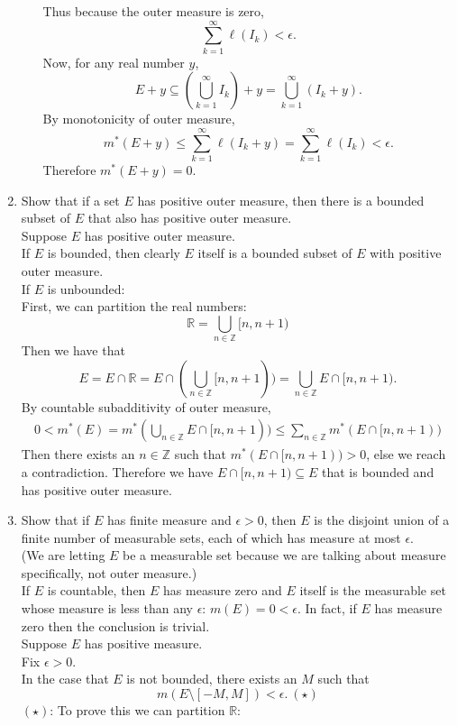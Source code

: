 \begin{enumerate}
\begin{enumerate}[label=(\roman*),align=left]
		Thus because the outer measure is zero, 
		\[
			\sum_{k=1}^\infty \ell(I_k) <\epsilon.
		\]
		Now, for any real number $y$,
		\[
			E+y \subseteq (\bigcup_{k=1}^\infty I_k)+y=\bigcup_{k=1}^\infty (I_k+y).
		\]
		By monotonicity of outer measure, 
		\[
			m^*(E+y)\le \sum_{k=1}^\infty\ell(I_k+y)=\sum_{k=1}^\infty\ell(I_k)<\epsilon.
		\]
		Therefore $m^*(E+y)=0$.
    \end{enumerate}
    \item Show that if a set $E$ has positive outer measure, then there is a bounded subset of $E$ that also has positive outer measure.\\
    Suppose $E$ has positive outer measure.\\
	If $E$ is bounded, then clearly $E$ itself is a bounded subset of $E$ with positive outer measure.\\
	If $E$ is unbounded:\\
	First, we can partition the real numbers:
	\[
		\mathbb{R}=\bigcup_{n\in\mathbb{Z}}[n,n+1)	
	\]
	Then we have that 
	\[
		E=E\cap \mathbb{R}=E\cap(\bigcup_{n\in\mathbb{Z}}[n,n+1))=\bigcup_{n\in\mathbb{Z}}E\cap[n,n+1).
	\]
	By countable subadditivity of outer measure,
	\begin{align*}
		0<m^*(E)=m^*(\bigcup_{n\in\mathbb{Z}}E\cap[n,n+1))\le\sum_{n\in\mathbb{Z}}m^*(E\cap[n,n+1))
	\end{align*}
	Then there exists an $n\in \mathbb{Z}$ such that $m^*(E\cap[n,n+1))>0$, else we reach a contradiction.
	Therefore we have $E\cap[n,n+1)\subseteq E$ that is bounded and has positive outer measure.
    \item Show that if $E$ has finite measure and $\epsilon>0$, then $E$ is the disjoint union of a finite number of measurable sets, each of which has measure at most $\epsilon$.\\
    (We are letting $E$ be a measurable set because we are talking about measure specifically, not outer measure.)\\
	If $E$ is countable, then $E$ has measure zero and $E$ itself is the measurable set whose measure is less than any $\epsilon$: $m(E)=0<\epsilon$.
	In fact, if $E$ has measure zero then the conclusion is trivial.\\
	Suppose $E$ has positive measure.\\
	Fix $\epsilon>0$.\\
	In the case that $E$ is not bounded, there exists an $M$ such that 
	\[
		m(E\setminus[-M,M])<\epsilon.\ (\star)
	\]
	$(\star)$: To prove this we can partition $\mathbb{R}$: 
	\[
\]
\end{enumerate}
